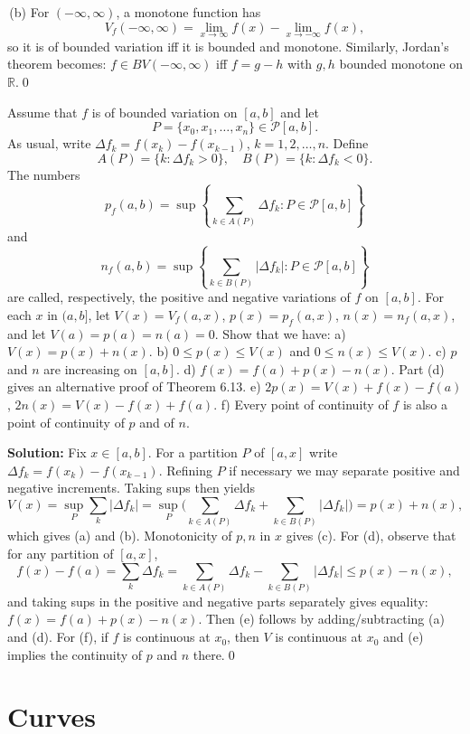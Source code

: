 \,(b) For $(-\infty,\infty)$, a monotone function has
\[V_f(-\infty,\infty)=\lim_{x\to\infty}f(x)-\lim_{x\to-\infty}f(x),\]
so it is of bounded variation iff it is bounded and monotone. Similarly, Jordan’s theorem becomes: $f\in BV(-\infty,\infty)$ iff $f=g-h$ with $g,h$ bounded monotone on $\mathbb{R}$.\qed


\begin{problembox}
Assume that $f$ is of bounded variation on $[a, b]$ and let
\[P = \{x_0, x_1, \ldots, x_n\} \in \mathcal{P}[a, b].\]
As usual, write $\Delta f_k = f(x_k) - f(x_{k-1})$, $k = 1, 2, \ldots, n$. Define
\[A(P) = \{k : \Delta f_k > 0\}, \quad B(P) = \{k : \Delta f_k < 0\}.\]
The numbers
\[p_f(a, b) = \sup \left\{ \sum_{k \in A(P)} \Delta f_k : P \in \mathcal{P}[a, b] \right\}\]
and
\[n_f(a, b) = \sup \left\{ \sum_{k \in B(P)} |\Delta f_k| : P \in \mathcal{P}[a, b] \right\}\]
are called, respectively, the positive and negative variations of $f$ on $[a, b]$. For each $x$ in $(a, b]$, let $V(x) = V_f(a, x)$, $p(x) = p_f(a, x)$, $n(x) = n_f(a, x)$, and let $V(a) = p(a) = n(a) = 0$. Show that we have:
a) $V(x) = p(x) + n(x)$.
b) $0 \leq p(x) \leq V(x)$ and $0 \leq n(x) \leq V(x)$.
c) $p$ and $n$ are increasing on $[a, b]$.
d) $f(x) = f(a) + p(x) - n(x)$. Part (d) gives an alternative proof of Theorem 6.13.
e) $2p(x) = V(x) + f(x) - f(a)$, $2n(x) = V(x) - f(x) + f(a)$.
f) Every point of continuity of $f$ is also a point of continuity of $p$ and of $n$.
\end{problembox}

\noindent\textbf{Solution:}
Fix $x\in[a,b]$. For a partition $P$ of $[a,x]$ write $\Delta f_k=f(x_k)-f(x_{k-1})$. Refining $P$ if necessary we may separate positive and negative increments. Taking sups then yields
\[V(x)=\sup_P\sum_k |\Delta f_k|=\sup_P\Big(\sum_{k\in A(P)}\!\Delta f_k+\sum_{k\in B(P)}\!|\Delta f_k|\Big)=p(x)+n(x),\]
which gives (a) and (b). Monotonicity of $p,n$ in $x$ gives (c). For (d), observe that for any partition of $[a,x]$,
\[f(x)-f(a)=\sum_k \Delta f_k=\sum_{k\in A(P)}\!\Delta f_k-\sum_{k\in B(P)}\!|\Delta f_k|\le p(x)-n(x),\]
and taking sups in the positive and negative parts separately gives equality: $f(x)=f(a)+p(x)-n(x)$. Then (e) follows by adding/subtracting (a) and (d). For (f), if $f$ is continuous at $x_0$, then $V$ is continuous at $x_0$ and (e) implies the continuity of $p$ and $n$ there.\qed
\section{Curves}



